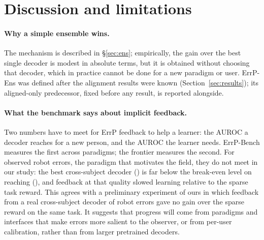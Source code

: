 \section{Discussion and limitations}
\label{sec:discussion}

\paragraph{Why a simple ensemble wins.} The mechanism is described in \S\ref{sec:ens}; empirically,
the gain over the best single decoder is modest in absolute terms, but it is obtained without choosing that
decoder, which in practice cannot be done for a new paradigm or user. ErrP-Ens was defined after the alignment results were
known (Section~\ref{sec:results}); its aligned-only predecessor, fixed before any result, is reported alongside.

\paragraph{What the benchmark says about implicit feedback.} Two numbers have to meet for ErrP feedback to help
a learner: the AUROC a decoder reaches for a new person, and the AUROC the learner needs. ErrP-Bench measures
the first across paradigms; the frontier measures the second. For observed robot errors, the paradigm that
motivates the field, they do not meet in our study: the best cross-subject decoder (\BestErrpHriRobot{}) is far
below the break-even level on reaching (\RLBreakEvenReach{}), and feedback at that quality slowed learning
relative to the sparse task reward. This agrees with a preliminary experiment of ours in which feedback from a
real cross-subject decoder of robot errors gave no gain over the sparse reward on the same task. It suggests that progress will come from paradigms and interfaces that make
errors more salient to the observer, or from per-user calibration, rather than from larger pretrained decoders.

